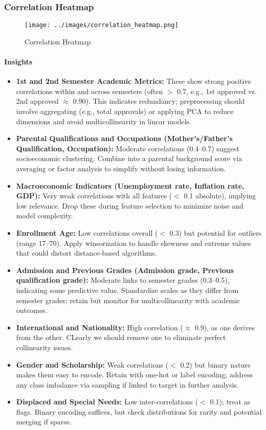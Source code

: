 \documentclass[twoside,final]{hcmut-report}
\begin{document}
\subsubsection{Correlation Heatmap}
\begin{figure}[H]
  \centering
  \texttt{[image: ../images/correlation\_heatmap.png]}
  \caption{Correlation Heatmap}
  \label{core_heat}
\end{figure}
\paragraph{Insights}
\begin{itemize}
  \item \textbf{1st and 2nd Semester Academic Metrics:} These show strong positive correlations within and across semesters (often $>$ 0.7, e.g., 1st approved vs. 2nd approved $\approx$ 0.90). This indicates redundancy; preprocessing should involve aggregating (e.g., total approvals) or applying PCA to reduce dimensions and avoid multicollinearity in linear models.
  \item \textbf{Parental Qualifications and Occupations (Mother's/Father's Qualification, Occupation):} Moderate correlations (0.4--0.7) suggest socioeconomic clustering. Combine into a parental background score via averaging or factor analysis to simplify without losing information.
  \item \textbf{Macroeconomic Indicators (Unemployment rate, Inflation rate, GDP):} Very weak correlations with all features ($<$ 0.1 absolute), implying low relevance. Drop these during feature selection to minimize noise and model complexity.
  \item \textbf{Enrollment Age:} Low correlations overall ($<$ 0.3) but potential for outliers (range 17--70). Apply winsorization to handle skewness and extreme values that could distort distance-based algorithms.
  \item \textbf{Admission and Previous Grades (Admission grade, Previous qualification grade):} Moderate links to semester grades (0.3--0.5), indicating some predictive value. Standardize scales as they differ from semester grades; retain but monitor for multicollinearity with academic outcomes.
  \item \textbf{International and Nationality:} High correlation ($\approx$ 0.9), as one derives from the other. CLearly we should remove one to eliminate perfect collinearity issues.
  \item \textbf{Gender and Scholarship:} Weak correlations ($<$ 0.2) but binary nature makes them easy to encode. Retain with one-hot or label encoding; address any class imbalance via sampling if linked to target in further analysis.
  \item \textbf{Displaced and Special Needs:} Low inter-correlations ($<$ 0.1); treat as flags. Binary encoding suffices, but check distributions for rarity and potential merging if sparse.
\end{itemize}
\end{document}
